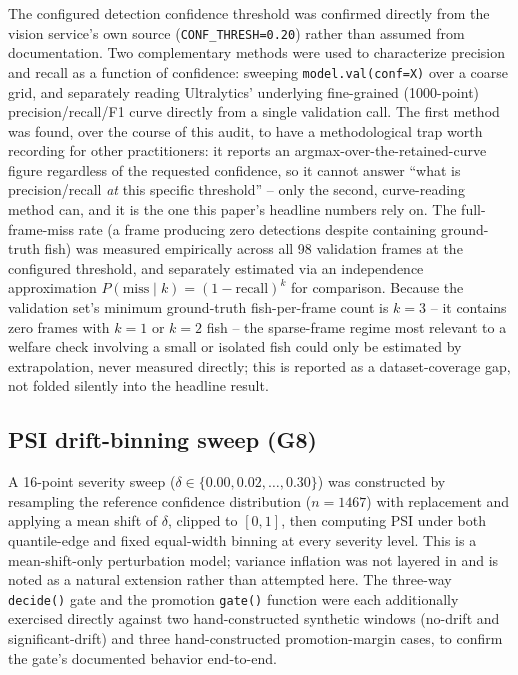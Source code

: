 The configured detection confidence threshold was confirmed directly from the vision service's own
source (\texttt{CONF\_THRESH=0.20}) rather than assumed from documentation. Two complementary
methods were used to characterize precision and recall as a function of confidence: sweeping
\texttt{model.val(conf=X)} over a coarse grid, and separately reading Ultralytics' underlying
fine-grained (1000-point) precision/recall/F1 curve directly from a single validation call. The
first method was found, over the course of this audit, to have a methodological trap worth
recording for other practitioners: it reports an argmax-over-the-retained-curve figure regardless
of the requested confidence, so it cannot answer ``what is precision/recall \emph{at} this specific
threshold'' -- only the second, curve-reading method can, and it is the one this paper's headline
numbers rely on. The full-frame-miss rate (a frame producing zero detections despite containing
ground-truth fish) was measured empirically across all 98 validation frames at the configured
threshold, and separately estimated via an independence approximation
$P(\text{miss}\mid k) = (1-\text{recall})^k$ for comparison. Because the validation set's minimum
ground-truth fish-per-frame count is $k=3$ -- it contains zero frames with $k=1$ or $k=2$ fish --
the sparse-frame regime most relevant to a welfare check involving a small or isolated fish could
only be estimated by extrapolation, never measured directly; this is reported as a dataset-coverage
gap, not folded silently into the headline result.

\subsection{PSI drift-binning sweep (G8)}

A 16-point severity sweep ($\delta \in \{0.00, 0.02, \ldots, 0.30\}$) was constructed by resampling
the reference confidence distribution ($n=1467$) with replacement and applying a mean shift of
$\delta$, clipped to $[0,1]$, then computing PSI under both quantile-edge and fixed equal-width
binning at every severity level. This is a mean-shift-only perturbation model; variance inflation
was not layered in and is noted as a natural extension rather than attempted here. The three-way
\texttt{decide()} gate and the promotion \texttt{gate()} function were each additionally exercised
directly against two hand-constructed synthetic windows (no-drift and significant-drift) and three
hand-constructed promotion-margin cases, to confirm the gate's documented behavior end-to-end.

